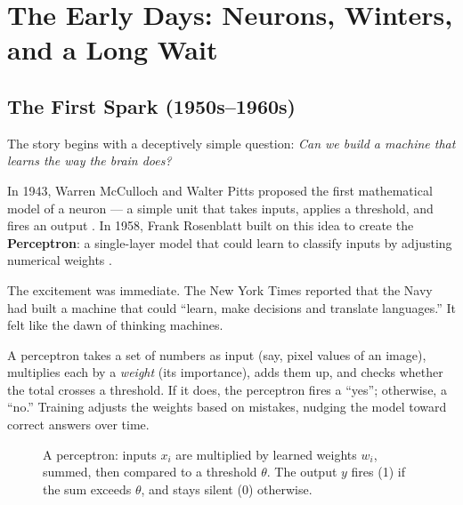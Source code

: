 \section{The Early Days: Neurons, Winters, and a Long Wait}

\subsection{The First Spark (1950s--1960s)}

The story begins with a deceptively simple question: \emph{Can we build a machine that learns the way the brain does?}

In 1943, Warren McCulloch and Walter Pitts proposed the first mathematical model of a neuron --- a simple unit that takes inputs, applies a threshold, and fires an output \cite{mcculloch1943logical}.
In 1958, Frank Rosenblatt built on this idea to create the \textbf{Perceptron}: a single-layer model that could learn to classify inputs by adjusting numerical weights \cite{rosenblatt1958perceptron}.

The excitement was immediate.
The New York Times reported that the Navy had built a machine that could ``learn, make decisions and translate languages.''
It felt like the dawn of thinking machines.

\begin{tcolorbox}[colback=blue!5!white, colframe=blue!40!black, title=What is a Perceptron?]
A perceptron takes a set of numbers as input (say, pixel values of an image), multiplies each by a \emph{weight} (its importance), adds them up, and checks whether the total crosses a threshold.
If it does, the perceptron fires a ``yes''; otherwise, a ``no.''
Training adjusts the weights based on mistakes, nudging the model toward correct answers over time.
\end{tcolorbox}

\begin{figure}[htb]
\centering
{}
\caption{A perceptron: inputs $x_i$ are multiplied by learned weights $w_i$, summed, then compared to a threshold $\theta$. The output $y$ fires (1) if the sum exceeds $\theta$, and stays silent (0) otherwise.}
\end{figure}

